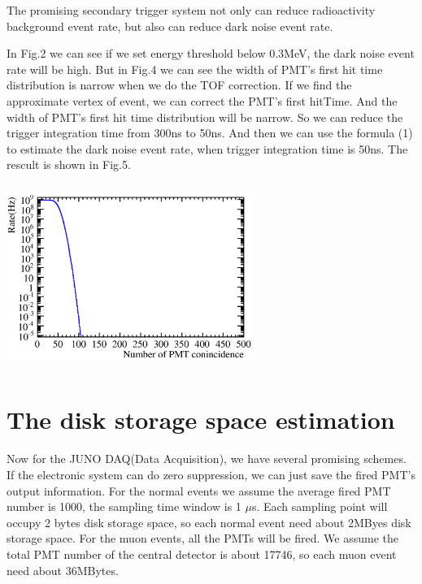 \documentclass[a4paper,10pt,twoside]{paper}
\begin{document}
	\begin{multicols}{2}


		The promising secondary trigger system not only can
		reduce radioactivity background event rate, but also can
		reduce dark noise event rate.


		In Fig.2 we can see if we set energy threshold below
		0.3MeV, the dark noise event rate will be high. But in
		Fig.4 we can see the width of PMT's first hit time distribution
		is narrow when we do the TOF correction.
		If we find the approximate vertex of
		event, we can correct the PMT's first hitTime. And the
		width of PMT's first hit time distribution will be narrow.
		So we can reduce the trigger integration time from 300ns
		to 50ns. And then we can use the formula (1) to estimate
		the dark noise event rate, when trigger integration time
		is 50ns. The rescult is shown in Fig.5.


		\begin{center}
			\includegraphics[width=8cm,height=6cm]{Noise_rate_50kHz_50ns.eps}
		\end{center}


		\section{The disk storage space estimation}
		Now for the JUNO DAQ(Data Acquisition), we have several promising schemes. 
		If the electronic system can do zero suppression, we can just
		save the fired PMT's output information.
		For the normal
		events we assume the average fired PMT number is 1000, the sampling time window 
		is 1 $\mu$s. Each sampling point will occupy 2 bytes disk storage space, so each
		normal event need about 2MByes disk storage space. For the muon events, all the 
		PMTs will be fired. We assume the total PMT number of the central detector is about 
		17746, so each muon event need about 36MBytes.


\end{multicols}
\end{document}
